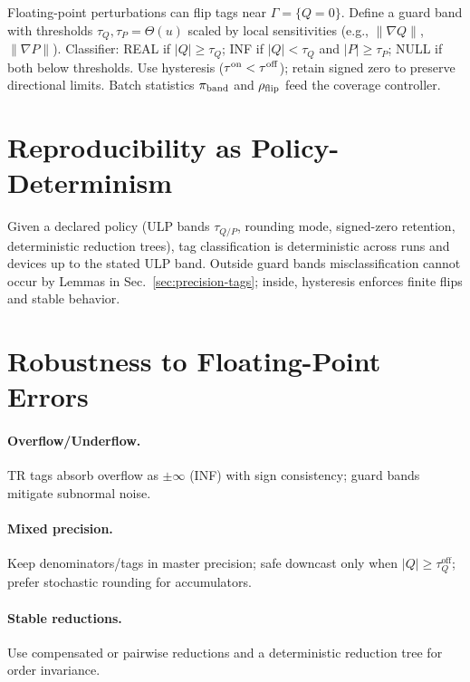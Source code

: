 \documentclass[twoside,11pt]{article}
\begin{document}
Floating-point perturbations can flip tags near $\Gamma=\{Q=0\}$. Define a guard band with thresholds $\tau_Q,\tau_P=\Theta(u)$ scaled by local sensitivities (e.g., $\|\nabla Q\|$, $\|\nabla P\|$). Classifier: REAL if $|Q|\ge\tau_Q$; INF if $|Q|<\tau_Q$ and $|P|\ge\tau_P$; NULL if both below thresholds. Use hysteresis ($\tau^{\rm on}<\tau^{\rm off}$); retain signed zero to preserve directional limits. Batch statistics $\pi_{\rm band}$ and $\rho_{\rm flip}$ feed the coverage controller.

\section*{Reproducibility as Policy-Determinism}
\label{sec:policy-determinism}
Given a declared policy (ULP bands $\tau_{Q/P}$, rounding mode, signed-zero retention, deterministic reduction trees), tag classification is deterministic across runs and devices up to the stated ULP band. Outside guard bands misclassification cannot occur by Lemmas in Sec.~\ref{sec:precision-tags}; inside, hysteresis enforces finite flips and stable behavior.

\section*{Robustness to Floating-Point Errors}
\label{sec:fp-robustness}
\paragraph{Overflow/Underflow.} TR tags absorb overflow as $\pm\infty$ (INF) with sign consistency; guard bands mitigate subnormal noise.\par
\paragraph{Mixed precision.} Keep denominators/tags in master precision; safe downcast only when $|Q|\ge \tau_Q^{\mathrm{off}}$; prefer stochastic rounding for accumulators.\par
\paragraph{Stable reductions.} Use compensated or pairwise reductions and a deterministic reduction tree for order invariance.\par
\end{document}
